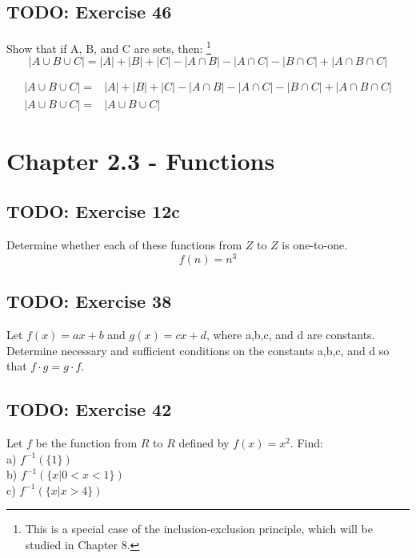 \documentclass[12pt]{article}
\begin{document}
    \subsection{TODO: Exercise 46}
    Show that if A, B, and C are sets, then:
    \footnote{This is a special case of the inclusion-exclusion principle, which will be studied in Chapter 8.}
    \begin{equation}
        |A \cup B \cup C| = 
        |A| + |B| + |C| - |A \cap B| - |A \cap C| - |B \cap C| + |A \cap B \cap C|
    \end{equation}

    \begin{equation}
        \begin{split}
            |A \cup B \cup C| =& 
              |A| + |B| + |C| - |A \cap B| 
            - |A \cap C| - |B \cap C| + |A \cap B \cap C|       
            \\
            |A \cup B \cup C| =& 
            |A \cup B \cup C|
        \end{split}
    \end{equation}

    \pagebreak     
    \section{Chapter 2.3 - Functions}
    \subsection{TODO: Exercise 12c}
    Determine whether each of these functions from $Z$ to $Z$ is one-to-one.
        \begin{equation}
            f(n) = n^3
        \end{equation}

    \subsection{TODO: Exercise 38}
    Let $f(x) = ax+b$ and $g(x)= cx+d$, where a,b,c, and d are constants. Determine necessary and sufficient conditions on the constants a,b,c, and d so that $f \cdot g = g \cdot f$. 
    \subsection{TODO: Exercise 42}
    Let $f$ be the function from $R$ to $R$ defined by $f(x)=x^2$. Find:\\
    a) $f^{-1}(\{1\})$\\
    b) $f^{-1}(\{ x | 0 < x < 1\})$\\
    c) $f^{-1}(\{ x | x > 4\})$
    
\end{document}

